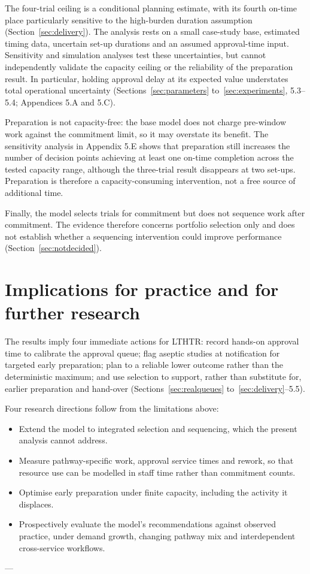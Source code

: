 The four-trial ceiling is a conditional planning estimate, with its fourth on-time place particularly sensitive to the high-burden duration assumption (Section~\ref{sec:delivery}). The analysis rests on a small case-study base, estimated timing data, uncertain set-up durations and an assumed approval-time input. Sensitivity and simulation analyses test these uncertainties, but cannot independently validate the capacity ceiling or the reliability of the preparation result. In particular, holding approval delay at its expected value understates total operational uncertainty (Sections~\ref{sec:parameters} to~\ref{sec:experiments}, 5.3--5.4; Appendices 5.A and 5.C).

Preparation is not capacity-free: the base model does not charge pre-window work against the commitment limit, so it may overstate its benefit. The sensitivity analysis in Appendix 5.E shows that preparation still increases the number of decision points achieving at least one on-time completion across the tested capacity range, although the three-trial result disappears at two set-ups. Preparation is therefore a capacity-consuming intervention, not a free source of additional time.

Finally, the model selects trials for commitment but does not sequence work after commitment. The evidence therefore concerns portfolio selection only and does not establish whether a sequencing intervention could improve performance (Section~\ref{sec:notdecided}).

\section{Implications for practice and for further research}
\label{sec:implications}

The results imply four immediate actions for LTHTR: record hands-on approval time to calibrate the approval queue; flag aseptic studies at notification for targeted early preparation; plan to a reliable lower outcome rather than the deterministic maximum; and use selection to support, rather than substitute for, earlier preparation and hand-over (Sections~\ref{sec:realqueues} to~\ref{sec:delivery}--5.5).

Four research directions follow from the limitations above:

\begin{itemize}
  \item Extend the model to integrated selection and sequencing, which the present analysis cannot address.
  \item Measure pathway-specific work, approval service times and rework, so that resource use can be modelled in staff time rather than commitment counts.
  \item Optimise early preparation under finite capacity, including the activity it displaces.
  \item Prospectively evaluate the model's recommendations against observed practice, under demand growth, changing pathway mix and interdependent cross-service workflows.
\end{itemize}

---


